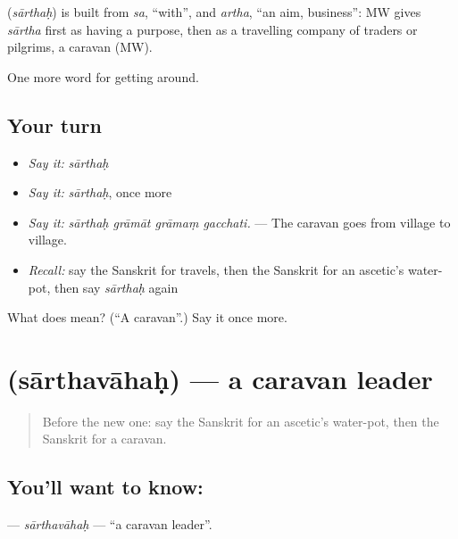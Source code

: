 \begin{cousinweb}
\textbf{} (\emph{sārthaḥ}) is built from \emph{sa}, \textquotedblleft{}with\textquotedblright{}, and \emph{artha}, \textquotedblleft{}an aim, business\textquotedblright{}: MW gives \emph{sārtha} first as having a purpose, then as a travelling company of traders or pilgrims, a caravan (MW).
\end{cousinweb}

\begin{grammarlens}[title={What you've built}]
One more word for getting around.
\end{grammarlens}

\subsection*{Your turn}
\begin{itemize}
\raggedright
  \item \emph{Say it:} \emph{sārthaḥ}
  \item \emph{Say it:} \emph{sārthaḥ}, once more
  \item \emph{Say it:} \emph{sārthaḥ grāmāt grāmaṃ gacchati.} — The caravan goes from village to village.
  \item \emph{Recall:} say the Sanskrit for travels, then the Sanskrit for an ascetic's water-pot, then say \emph{sārthaḥ} again
\end{itemize}

\begin{tcolorbox}[breakable,colback=teal!4,colframe=teal!35!black,title={Before you move on}]
What does  mean? (\textquotedblleft{}A caravan\textquotedblright{}.) Say it once more.
\end{tcolorbox}
\section[\texorpdfstring{\sk{सार्थवाहः} (sārthavāhaḥ)}{सार्थवाहः (sārthavāhaḥ)}]{ (sārthavāhaḥ) — a caravan leader}

\label{lesson:SA-C395-sarthavahah}



\begin{quote}
Before the new one: say the Sanskrit for an ascetic's water-pot, then the Sanskrit for a caravan.
\end{quote}

\subsection*{You'll want to know: }
\textbf{} — \emph{sārthavāhaḥ} — \textquotedblleft{}a caravan leader\textquotedblright{}.

